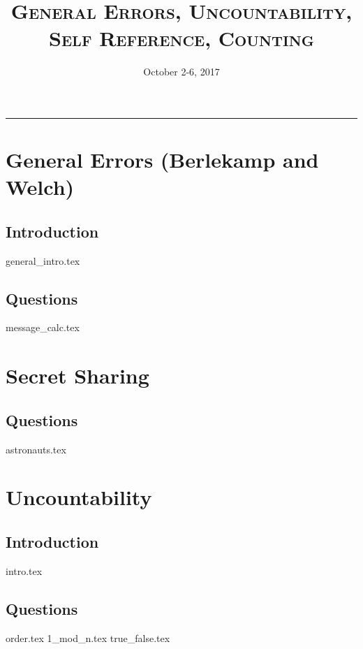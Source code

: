 \documentclass{exam}
\title{\textsc{General Errors, Uncountability, Self Reference, Counting}}
\date{October 2-6, 2017}
\begin{document}
\maketitle
\rule{\textwidth}{0.15em}
\fontsize{12}{15}\selectfont

\section{General Errors (Berlekamp and Welch)}
\subsection{Introduction}
{general_intro.tex}
\subsection{Questions}
\begin{questions}
{message_calc.tex}
\end{questions}

\section{Secret Sharing}
\subsection{Questions}
\begin{questions}
{astronauts.tex}
\end{questions}

\section{Uncountability}
\subsection{Introduction}
\begin{questions}
{intro.tex}
\end{questions}
\subsection{Questions}
\begin{questions}
{order.tex}
{1_mod_n.tex}
{true_false.tex}
\end{questions}
\end{document}
